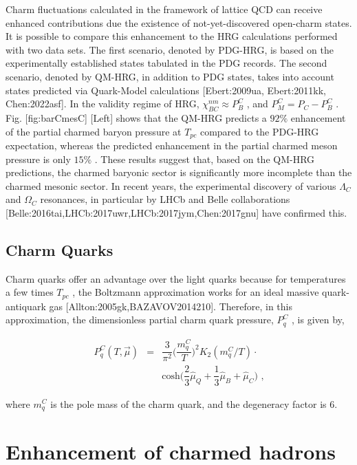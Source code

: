 \documentclass[11pt,a4paper]{article}
\begin{document}
Charm fluctuations calculated in the framework of lattice QCD can receive enhanced contributions due the existence of not-yet-discovered open-charm states. It is possible to compare this enhancement to the HRG calculations performed with two data sets. The first scenario, denoted by PDG-HRG, is based on the experimentally established states tabulated in the PDG records. The second scenario, denoted by QM-HRG, in addition to PDG states, takes into account states predicted via Quark-Model calculations [Ebert:2009ua, Ebert:2011kk, Chen:2022asf]. In the validity regime of HRG,  $\chi^{nm}_{BC}\approx P^C_{B}$ , and  $P^C_{M} = P_C-P^C_{B}$ . Fig. [fig:barCmesC] [Left] shows that the QM-HRG predicts a  $92\%$  enhancement of the partial charmed baryon pressure at  $T_{pc}$  compared to the PDG-HRG expectation, whereas the predicted enhancement in the partial charmed meson pressure is only  $15\%$ . These results suggest that, based on the QM-HRG predictions, the charmed baryonic sector is significantly more incomplete than the charmed mesonic sector. In recent years, the experimental discovery of various  $\Lambda_C$  and  $\Omega_C$  resonances, in particular by LHCb and Belle collaborations [Belle:2016tai,LHCb:2017uwr,LHCb:2017jym,Chen:2017gnu] have confirmed this.

\subsection{Charm Quarks}

Charm quarks offer an advantage over the light quarks because for temperatures a few times  $T_{pc}$ , the Boltzmann approximation works for an ideal massive quark-antiquark gas [Allton:2005gk,BAZAVOV2014210]. Therefore, in this approximation, the dimensionless partial charm quark pressure,  $P^C_{q}$ , is given by,

$$\begin{eqnarray}
	P^C_{q}(T,\overrightarrow{\mu})&=&\dfrac{3}{\pi^2}\bigg(\dfrac{m_q^C}{T}\bigg)^2K_2(m_q^C/T)\cdot \nonumber \\
	&&\text{cosh}\bigg(\dfrac{2}{3}\hat{\mu}_Q+\dfrac{1}{3}\hat{\mu}_B+\hat{\mu}_C\bigg) \text { ,}
	
\end{eqnarray}$$

where  $m_q^C$  is the pole mass of the charm quark, and the degeneracy factor is 6.

\section{Enhancement of charmed hadrons}
\end{document}
